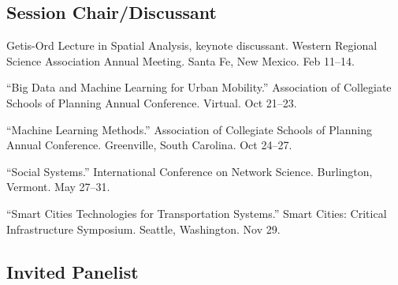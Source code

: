 \documentclass[11pt,a4paper]{report} %
\begin{document}
\subsection*{Session Chair/Discussant}

\begin{tablist}

\item[2026] \tab{}Getis-Ord Lecture in Spatial Analysis, keynote discussant. Western Regional Science Association Annual Meeting. Santa Fe, New Mexico. Feb 11--14.

\item[2021] \tab{}\enquote{Big Data and Machine Learning for Urban Mobility.} Association of Collegiate Schools of Planning Annual Conference. Virtual. Oct 21--23.

\item[2019] \tab{}\enquote{Machine Learning Methods.} Association of Collegiate Schools of Planning Annual Conference. Greenville, South Carolina. Oct 24--27.

\item[2019] \tab{}\enquote{Social Systems.} International Conference on Network Science. Burlington, Vermont. May 27--31.

\item[2018] \tab{}\enquote{Smart Cities Technologies for Transportation Systems.} Smart Cities: Critical Infrastructure Symposium. Seattle, Washington. Nov 29.

\end{tablist}

\subsection*{Invited Panelist}
\end{document}
